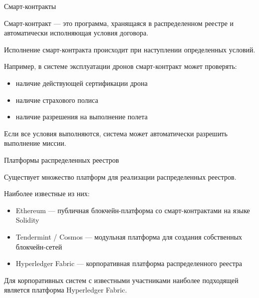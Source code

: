 \documentclass[aspectratio=169]{beamer}
\begin{document}
\begin{frame}{Смарт-контракты}

Смарт-контракт — это программа, хранящаяся в распределенном реестре и автоматически исполняющая условия договора.

Исполнение смарт-контракта происходит при наступлении определенных условий.

Например, в системе эксплуатации дронов смарт-контракт может проверять:

\begin{itemize}
\item наличие действующей сертификации дрона
\item наличие страхового полиса
\item наличие разрешения на выполнение полета
\end{itemize}

Если все условия выполняются, система может автоматически разрешить выполнение миссии.

\end{frame}


\begin{frame}{Платформы распределенных реестров}

Существует множество платформ для реализации распределенных реестров.

Наиболее известные из них:

\begin{itemize}
\item Ethereum — публичная блокчейн-платформа со смарт-контрактами на языке Solidity
\item Tendermint / Cosmos — модульная платформа для создания собственных блокчейн-сетей
\item Hyperledger Fabric — корпоративная платформа распределенного реестра
\end{itemize}

Для корпоративных систем с известными участниками наиболее подходящей является платформа Hyperledger Fabric.

\end{frame}

\end{document}
